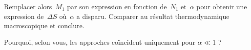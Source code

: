 \question
Remplacer alors~$M_1$ par son expression en fonction de~$N_1$
et~$\alpha$ pour obtenir une expression de~$\Delta S$ où~$\alpha$ a
disparu. Comparer au résultat thermodynamique macroscopique et conclure.

\question Pourquoi, selon vous, les approches coïncident uniquement pour $\alpha \ll 1$ ?
